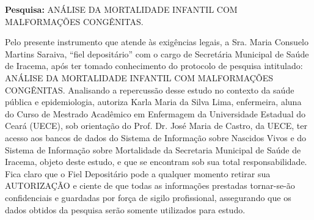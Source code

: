 \label{ap:termo-de-fiel-depositario}

\noindent \textbf{Pesquisa:} ANÁLISE DA MORTALIDADE INFANTIL COM MALFORMAÇÕES CONGÊNITAS.

\noindent Pelo presente instrumento que atende às exigências legais, a Sra. Maria Consuelo Martins Saraiva, ``fiel depositário'' com o cargo de Secretária Municipal de Saúde de Iracema, após ter tomado conhecimento do protocolo de pesquisa intitulado: ANÁLISE DA MORTALIDADE INFANTIL COM MALFORMAÇÕES CONGÊNITAS. Analisando a repercussão desse estudo no contexto da saúde pública e epidemiologia, autoriza Karla Maria da Silva Lima, enfermeira, aluna do Curso de Mestrado Acadêmico em Enfermagem da Universidade Estadual do Ceará (UECE), sob orientação do Prof. Dr. José Maria de Castro, da UECE, ter acesso aos bancos de dados do Sistema de Informação sobre Nascidos Vivos e do Sistema de Informação sobre Mortalidade da Secretaria Municipal de Saúde de Iracema, objeto deste estudo, e que se encontram sob sua total responsabilidade. Fica claro que o Fiel Depositário pode a qualquer momento retirar sua AUTORIZAÇÃO e ciente de que todas as informações prestadas tornar-se-ão confidenciais e guardadas por força de sigilo profissional, assegurando que os dados obtidos da pesquisa serão somente utilizados para estudo.